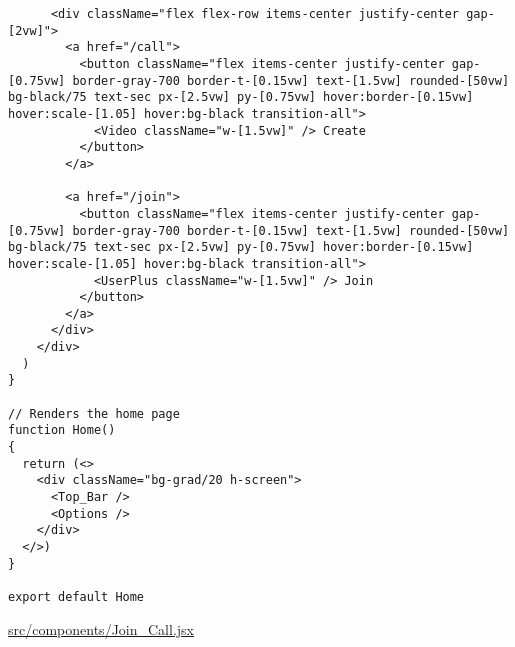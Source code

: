 \begin{verbatim}
      <div className="flex flex-row items-center justify-center gap-[2vw]">
        <a href="/call">
          <button className="flex items-center justify-center gap-[0.75vw] border-gray-700 border-t-[0.15vw] text-[1.5vw] rounded-[50vw] bg-black/75 text-sec px-[2.5vw] py-[0.75vw] hover:border-[0.15vw] hover:scale-[1.05] hover:bg-black transition-all">
            <Video className="w-[1.5vw]" /> Create
          </button>
        </a>

        <a href="/join">
          <button className="flex items-center justify-center gap-[0.75vw] border-gray-700 border-t-[0.15vw] text-[1.5vw] rounded-[50vw] bg-black/75 text-sec px-[2.5vw] py-[0.75vw] hover:border-[0.15vw] hover:scale-[1.05] hover:bg-black transition-all">
            <UserPlus className="w-[1.5vw]" /> Join
          </button>
        </a>
      </div>
    </div>
  )
}

// Renders the home page
function Home()
{
  return (<>
    <div className="bg-grad/20 h-screen">
      <Top_Bar />
      <Options />
    </div>
  </>)
}

export default Home
\end{verbatim}

\underline{src/components/Join\_Call.jsx}

